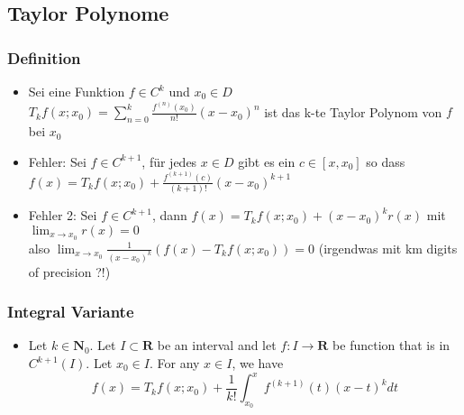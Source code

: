 \documentclass[a3paper, 11pt, landscape]{scrartcl}
\begin{document}
\begin{multicols*}{3}
	\subsection{Taylor Polynome}
	\subsubsection{Definition}
	\begin{itemize}
	    \item Sei eine Funktion $f\in C^k$ und $x_0\in D$\\
	    $T_k f(x;x_0)=\sum_{n=0}^k\frac{f^(n)(x_0)}{n!}(x-x_0)^n$ ist das k-te Taylor Polynom von $f$ bei $x_0$
	    \item Fehler: Sei $f\in C^{k+1}$, für jedes $x\in D$ gibt es ein $c\in[x,x_0]$ so dass\\
	    $f(x)=T_{k} f\left(x ; x_{0}\right)+\frac{f^{(k+1)}(c)}{(k+1) !}\left(x-x_{0}\right)^{k+1}$
	    \item Fehler 2: Sei $f\in C^{k+1}$, dann $f(x)=T_k f(x;x_0)+(x-x_0)^k r(x)$ mit $\lim_{x\to x_0}r(x)=0$\\
	    also $\lim _{x \rightarrow x_{0}} \frac{1}{\left(x-x_{0}\right)^{k}}\left(f(x)-T_{k} f\left(x ; x_{0}\right)\right)=0$ (irgendwas mit km digits of precision ?!)
	\end{itemize}
	\subsubsection{Integral Variante}
	\begin{itemize}
	    \item Let $k \in \mathbf{N}_{0}$. Let $I \subset \mathbf{R}$ be an interval and let $f: I \rightarrow \mathbf{R}$ be function that is in $C^{k+1}(I) .$ Let $x_{0} \in I .$ For any $x \in I$, we have
        $$
        f(x)=T_{k} f\left(x ; x_{0}\right)+\frac{1}{k !} \int_{x_{0}}^{x} f^{(k+1)}(t)(x-t)^{k} d t
        $$
	\end{itemize}

    
    	

\end{multicols*}
\end{document}
